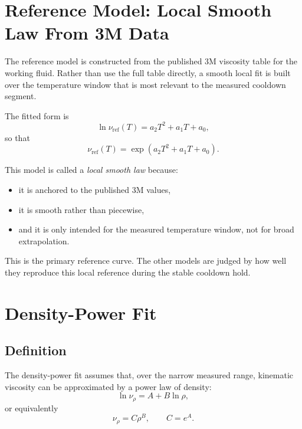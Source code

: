 \documentclass[11pt]{article}
\begin{document}
\section{Reference Model: Local Smooth Law From 3M Data}

The reference model is constructed from the published 3M viscosity table for
the working fluid. Rather than use the full table directly, a smooth local fit
is built over the temperature window that is most relevant to the measured
cooldown segment.

The fitted form is
\begin{equation}
    \ln \nu_{\mathrm{ref}}(T) = a_2 T^2 + a_1 T + a_0,
\end{equation}
so that
\begin{equation}
    \nu_{\mathrm{ref}}(T) = \exp\!\left(a_2 T^2 + a_1 T + a_0\right).
\end{equation}

This model is called a \emph{local smooth law} because:
\begin{itemize}
    \item it is anchored to the published 3M values,
    \item it is smooth rather than piecewise,
    \item and it is only intended for the measured temperature window, not for
          broad extrapolation.
\end{itemize}

This is the primary reference curve. The other models are judged by how well
they reproduce this local reference during the stable cooldown hold.

\section{Density-Power Fit}

\subsection{Definition}

The density-power fit assumes that, over the narrow measured range,
kinematic viscosity can be approximated by a power law of density:
\begin{equation}
    \ln \nu_{\rho} = A + B \ln \rho,
\end{equation}
or equivalently
\begin{equation}
    \nu_{\rho} = C \rho^B,
    \qquad
    C = e^A.
\end{equation}
\end{document}
